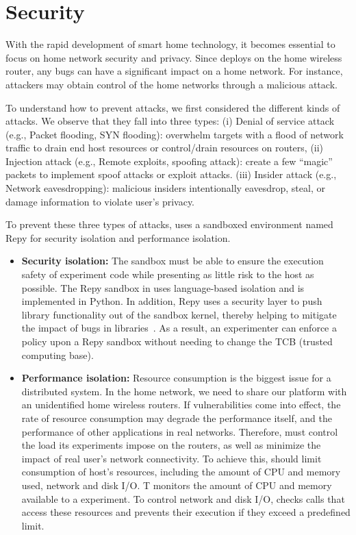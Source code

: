 \section{Security}
\label{sec.security}
With the rapid development of smart home technology, it becomes essential to
focus on home network security and privacy. Since \sysname deploys on the home
wireless router, any bugs can have a significant impact on a home network.
For instance, attackers may obtain control of the home networks
through a malicious attack.

To understand how to prevent attacks, we first considered the different kinds of
attacks. We observe that they fall into three types: (i) Denial of service attack
 (e.g., Packet flooding, SYN flooding\cite{eddy2011syn}): overwhelm targets with
  a flood of network traffic to drain end host resources or control/drain resources
   on routers, (ii) Injection attack (e.g., Remote exploits\cite{shellcode},
   spoofing attack\cite{bishop1996attack}): create a few ``magic'' packets to
   implement spoof attacks or exploit attacks. (iii) Insider attack (e.g.,
   Network eavesdropping): malicious insiders intentionally eavesdrop, steal,
   or damage information to violate user's privacy.

To prevent these three types of attacks, \sysname uses a sandboxed environment
 named Repy for security isolation and performance isolation.

\begin{itemize}
\item \textbf{Security isolation:} The sandbox must be able to ensure the execution
 safety of experiment code while presenting as little risk to the host as possible.
The Repy sandbox in \sysname uses language-based isolation and is implemented in Python.
In addition, Repy uses a security layer to push library functionality out of the
sandbox kernel, thereby helping to mitigate the impact of bugs in libraries~\cite{cappos2010retaining}.
As a result, an experimenter can enforce a policy upon a Repy sandbox without
needing to change the TCB (trusted computing base).
\item \textbf{Performance isolation:} Resource consumption is the biggest issue
for a distributed system. In the home network, we need to share our platform with
an unidentified home wireless routers. If vulnerabilities come into
effect\cite{joshi2013survey}, the rate of resource consumption may degrade
the performance itself, and the performance of other applications in real networks.
 Therefore, \sysname must control the load its experiments impose on the routers,
 as well as minimize the impact of real user's network connectivity. To achieve
 this, \sysname should limit consumption of host's resources, including the amount
  of CPU and memory used, network and disk I/O. T \sysname monitors the amount of
   CPU and memory available to a experiment. To control network and disk I/O, \sysname
   checks calls that access these resources and prevents their execution if they exceed a predefined limit.
\end{itemize}

